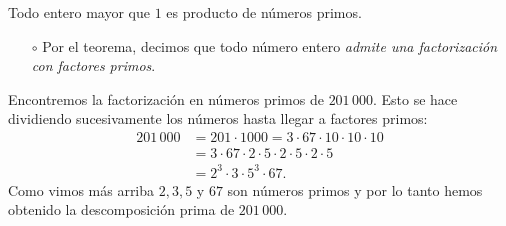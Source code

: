 \documentclass{beamer}
\begin{document}
    
    \begin{frame}
        \begin{teorema}
            Todo  entero  mayor que $1$ es producto de números primos. 
        \end{teorema}  
        \pause
        



    \end{frame}
    
    
    \begin{frame}

        \begin{observacion}
			\begin{itemize}
				\item[$\circ$] Por el teorema,  decimos que todo número entero \textit{admite una factorización con factores primos}.
			\end{itemize}
			
		\end{observacion}
        \pause
        \begin{ejemplo} 
            Encontremos la factorización en números primos de $201\,000$. Esto se hace di\-vi\-dien\-do  sucesivamente los números hasta llegar a factores primos:\pause
            \begin{align*}
                201\,000 &= 201\cdot 1000 = 3\cdot 67\cdot 10\cdot 10\cdot 10\\ &=  3\cdot 67\cdot 2\cdot 5 \cdot 2\cdot 5 \cdot 2\cdot 5 \\&= 2^3\cdot 3\cdot 5^3\cdot 67.
            \end{align*}
            Como vimos más arriba $2, 3, 5$ y $67$ son  números primos y por lo tanto hemos obtenido la descomposición prima de $201\,000$.
        \end{ejemplo}
    \end{frame}
    
\end{document}
